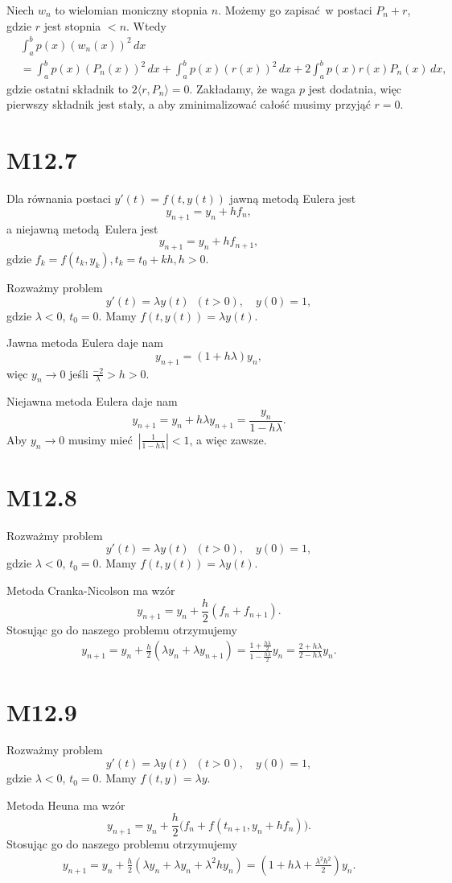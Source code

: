 \documentclass[a4paper, 12pt]{article}
\newcommand{\modulus}[1]{\left| #1 \right|}
\newcommand{\abs}{\modulus}
\newcommand{\+}{\enspace}
\begin{document}
Niech $w_n$ to wielomian moniczny stopnia $n$.
Możemy go zapisać w postaci $P_n + r$,
gdzie $r$ jest stopnia $<n$.
Wtedy
\begin{align*}
&∫_a^b p(x) (w_n(x))^2 \, dx \\
&=∫_a^b p(x) (P_n(x))^2 \, dx +
∫_a^b p(x) (r(x))^2 \, dx +
2∫_a^b p(x) r(x) P_n(x) \, dx,
\end{align*}
gdzie ostatni składnik to $2⟨r, P_n⟩ = 0$.
Zakładamy, że waga $p$ jest dodatnia,
więc pierwszy składnik jest stały,
a aby zminimalizować całość musimy przyjąć $r = 0$.

\section*{M12.7}
Dla równania postaci $y'(t) = f(t, y(t))$ jawną metodą Eulera jest
$$y_{n+1} = y_n + h f_n,$$
a niejawną metodą Eulera jest
$$y_{n+1} = y_n + h f_{n+1},$$
gdzie $f_k = f(t_k, y_k), t_k = t_0 + kh, h>0$.

Rozważmy problem
$$y'(t) = λy(t) \+ (t > 0), \quad y(0) = 1,$$
gdzie $λ < 0$, $t_0 = 0$.
Mamy $f(t,y(t)) = λy(t)$.

Jawna metoda Eulera daje nam
$$y_{n+1} = (1+hλ)y_n,$$
więc $y_n → 0$ jeśli $\frac{-2}{λ} > h > 0$.

Niejawna metoda Eulera daje nam
$$y_{n+1} = y_n + hλy_{n+1} = \frac{y_n}{1-hλ}.$$
Aby $y_n → 0$ musimy mieć $\abs{\frac{1}{1-hλ}} < 1$, a więc zawsze.

\section*{M12.8}
Rozważmy problem
$$y'(t) = λy(t) \+ (t > 0), \quad y(0) = 1,$$
gdzie $λ < 0$, $t_0 = 0$.
Mamy $f(t,y(t)) = λy(t)$.

Metoda Cranka-Nicolson ma wzór
$$y_{n+1} = y_n + \frac{h}{2}\left(f_n + f_{n+1}\right).$$
Stosując go do naszego problemu otrzymujemy
\begin{align*}
	y_{n+1}
	= y_n + \frac{h}{2}\left(λy_n + λy_{n+1}\right)
	= \frac{1 + \frac{hλ}{2}}{1 - \frac{hλ}{2}}y_n
	= \frac{2 + hλ}{2 - hλ}y_n.
\end{align*}

\section*{M12.9}
Rozważmy problem
$$y'(t) = λy(t) \+ (t > 0), \quad y(0) = 1,$$
gdzie $λ < 0$, $t_0 = 0$.
Mamy $f(t,y) = λy$.

Metoda Heuna ma wzór
$$y_{n+1} = y_n + \frac{h}{2}\Big(f_n + f(t_{n+1}, y_n + hf_n)\Big).$$
Stosując go do naszego problemu otrzymujemy
\begin{align*}
	y_{n+1}
	= y_n + \frac{h}{2}\left(λy_n + λy_n + λ^2hy_n\right)
	= \left(1 + hλ + \frac{λ^2 h^2}{2}\right)y_n.
\end{align*}
\end{document}
